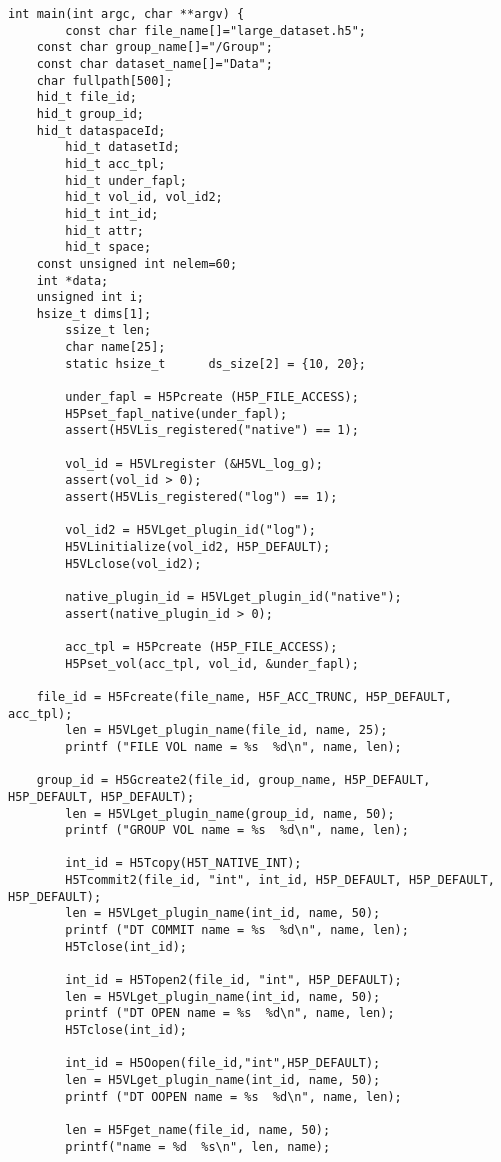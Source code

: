 \begin{appendices}
\begin{lstlisting}
int main(int argc, char **argv) {
        const char file_name[]="large_dataset.h5";
	const char group_name[]="/Group";
	const char dataset_name[]="Data";
	char fullpath[500];
	hid_t file_id;
	hid_t group_id;
	hid_t dataspaceId;
        hid_t datasetId;
        hid_t acc_tpl;
        hid_t under_fapl;
        hid_t vol_id, vol_id2;
        hid_t int_id;
        hid_t attr;
        hid_t space;
	const unsigned int nelem=60;
	int *data;
	unsigned int i;
	hsize_t dims[1];
        ssize_t len;
        char name[25];
        static hsize_t      ds_size[2] = {10, 20};

        under_fapl = H5Pcreate (H5P_FILE_ACCESS);
        H5Pset_fapl_native(under_fapl);
        assert(H5VLis_registered("native") == 1);

        vol_id = H5VLregister (&H5VL_log_g);
        assert(vol_id > 0);
        assert(H5VLis_registered("log") == 1);

        vol_id2 = H5VLget_plugin_id("log");
        H5VLinitialize(vol_id2, H5P_DEFAULT);
        H5VLclose(vol_id2);

        native_plugin_id = H5VLget_plugin_id("native");
        assert(native_plugin_id > 0);

        acc_tpl = H5Pcreate (H5P_FILE_ACCESS);
        H5Pset_vol(acc_tpl, vol_id, &under_fapl);

	file_id = H5Fcreate(file_name, H5F_ACC_TRUNC, H5P_DEFAULT, acc_tpl);
        len = H5VLget_plugin_name(file_id, name, 25);
        printf ("FILE VOL name = %s  %d\n", name, len);

	group_id = H5Gcreate2(file_id, group_name, H5P_DEFAULT, H5P_DEFAULT, H5P_DEFAULT);
        len = H5VLget_plugin_name(group_id, name, 50);
        printf ("GROUP VOL name = %s  %d\n", name, len);

        int_id = H5Tcopy(H5T_NATIVE_INT);
        H5Tcommit2(file_id, "int", int_id, H5P_DEFAULT, H5P_DEFAULT, H5P_DEFAULT);
        len = H5VLget_plugin_name(int_id, name, 50);
        printf ("DT COMMIT name = %s  %d\n", name, len);
        H5Tclose(int_id);

        int_id = H5Topen2(file_id, "int", H5P_DEFAULT);
        len = H5VLget_plugin_name(int_id, name, 50);
        printf ("DT OPEN name = %s  %d\n", name, len);
        H5Tclose(int_id);

        int_id = H5Oopen(file_id,"int",H5P_DEFAULT);
        len = H5VLget_plugin_name(int_id, name, 50);
        printf ("DT OOPEN name = %s  %d\n", name, len);

        len = H5Fget_name(file_id, name, 50);
        printf("name = %d  %s\n", len, name);


\end{lstlisting}
\end{appendices}
